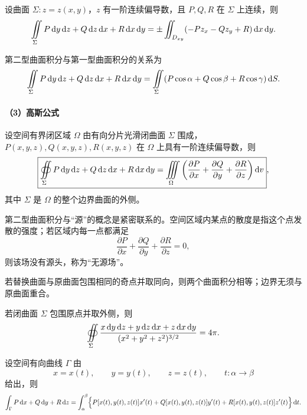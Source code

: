 设曲面 $\Sigma:z=z(x,y)$，$z$ 有一阶连续偏导数，且 $P,Q,R$ 在 $\Sigma$ 上连续，则
\[
\iintS P\dd y\dd z+Q\dd z\dd x+R\dd x\dd y
=\pm\iint_{D_{xy}}(-Pz_x-Qz_y+R)\dd x\dd y.
\]

第二型曲面积分与第一型曲面积分的关系为
\[
\iint\limits_{\Sigma} P\mathop{}\!\mathrm d y\mathop{}\!\mathrm d z+Q\mathop{}\!\mathrm d z\mathop{}\!\mathrm d x+R\mathop{}\!\mathrm d x\mathop{}\!\mathrm d y
=\iint\limits_{\Sigma}(P\cos\alpha+Q\cos\beta+R\cos\gamma)\mathop{}\!\mathrm d S.
\]

\paragraph{（3）高斯公式}

设空间有界闭区域 $\Omega$ 由有向分片光滑闭曲面 $\Sigma$ 围成，$P(x,y,z),Q(x,y,z),R(x,y,z)$ 在 $\Omega$ 上具有一阶连续偏导数，则
\[
\boxed{
\oiint\limits_{\Sigma} P\mathop{}\!\mathrm d y\mathop{}\!\mathrm d z+Q\mathop{}\!\mathrm d z\mathop{}\!\mathrm d x+R\mathop{}\!\mathrm d x\mathop{}\!\mathrm d y
=\iiint\limits_{\Omega}\left(
\frac{\partial P}{\partial x}
+\frac{\partial Q}{\partial y}
+\frac{\partial R}{\partial z}
\right)\mathop{}\!\mathrm d v
},
\]
其中 $\Sigma$ 是 $\Omega$ 的整个边界曲面的外侧。

\begin{notebox}
第二型曲面积分与“源”的概念是紧密联系的。空间区域内某点的散度是指这个点发散的强度；若区域内每一点都满足
\[
\frac{\partial P}{\partial x}
+\frac{\partial Q}{\partial y}
+\frac{\partial R}{\partial z}=0,
\]
则该场没有源头，称为“无源场”。
\end{notebox}



若替换曲面与原曲面包围相同的奇点并取同向，则两个曲面积分相等；边界无须与原曲面重合。

若闭曲面 $\Sigma$ 包围原点并取外侧，则
\[
\oiint\limits_{\Sigma}
\frac{x\mathop{}\!\mathrm d y\mathop{}\!\mathrm d z+y\mathop{}\!\mathrm d z\mathop{}\!\mathrm d x+z\mathop{}\!\mathrm d x\mathop{}\!\mathrm d y}
{(x^2+y^2+z^2)^{3/2}}
=4\pi.
\]



设空间有向曲线 $\Gamma$ 由
\[
x=x(t),\qquad y=y(t),\qquad z=z(t),\qquad t:\alpha\to\beta
\]
给出，则
\[
\int_{\Gamma}P\mathop{}\!\mathrm d x+Q\mathop{}\!\mathrm d y+R\mathop{}\!\mathrm d z
=\int_{\alpha}^{\beta}
\Bigl\{P[x(t),y(t),z(t)]x'(t)
+Q[x(t),y(t),z(t)]y'(t)
+R[x(t),y(t),z(t)]z'(t)\Bigr\}\mathop{}\!\mathrm d t.
\]


